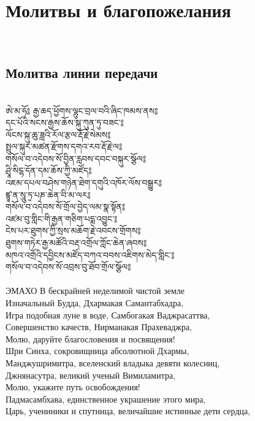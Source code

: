\section{Молитвы и благопожелания}
\\
\subsection{Молитва линии передачи}
\\
\ti
ཨེ་མ་ཧོ༔ རྒྱ་ཆད་ཕྱོགས་ལྷུང་བྲལ་བའི་ཞིང་ཁམས་ནས༔ \\
དང་པོའི་སངས་རྒྱས་ཆོས་སྐུ་ཀུན་ཏུ་བཟང་༔ \\
ལོངས་སྐུ་ཆུ་ཟླའི་རོལ་རྩལ་རྡོ་རྗེ་སེམས༔ \\
སྤྲུལ་སྐུར་མཚན་རྫོགས་དགའ་རབ་རྡོ་རྗེ་ལ༔ \\
གསོལ་བ་འདེབས་སོ་བྱིན་རླབས་དབང་བསྐུར་སྩོལ༔ \\
ཤྲཱི་སིངྷ་དོན་དམ་ཆོས་ཀྱི་མཛོད༔ \\
འཇམ་དཔལ་བཤེས་གཉེན་ཐེག་དགུའི་འཁོར་ལོས་བསྒྱུར༔ \\
ཛྙཱ་ན་སཱུ་ཏྲ་པཎ་ཆེན་བི་མ་ལར༔ \\
གསོལ་བ་འདེབས་སོ་གྲོལ་བྱེད་ལམ་སྣ་སྟོན༔ \\
འཛམ་བུ་གླིང་གི་རྒྱན་གཅིག་པདྨ་འབྱུང་༔ \\
ངེས་པར་ཐུགས་ཀྱི་སྲས་མཆོག་རྗེ་འབངས་གྲོགས༔ \\
ཐུགས་གཏེར་རྒྱ་མཚོའི་བརྡ་འགྲོལ་ཀློང་ཆེན་ཞབས༔ \\
མཁའ་འགྲོའི་དབྱིངས་མཛོད་བཀའ་བབས་འཇིགས་མེད་གླིང་༔ \\
གསོལ་བ་འདེབས་སོ་འབྲས་བུ་ཐོབ་གྲོལ་སྩོལ༔ \\
\\
\ru
ЭМАХО В бескрайней неделимой чистой земле\\
Изначальный Будда, Дхармакая Самантабхадра,\\
Игра подобная луне в воде, Самбогакая Ваджрасаттва,\\
Совершенство качеств, Нирманакая Прахеваджра,\\
Молю, даруйте благословения и посвящения!\\
Шри Синха, сокровищница абсолютной Дхармы,\\
Манджушримитра, вселенский владыка девяти колесниц,\\
Джнянасутра, великий ученый Вимиламитра,\\
Молю, укажите путь освобождения!\\
\newpage
Падмасамбхава, единственное украшение этого мира,\\
Царь, учениники и спутница, величайшие истинные дети сердца,\\
